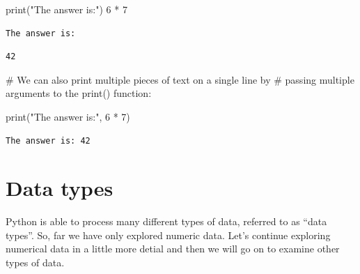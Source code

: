 \documentclass[
  letterpaper,
  DIV=11,
  numbers=noendperiod]{scrreprt}
\newenvironment{Shaded}{\begin{snugshade}}{\end{snugshade}}
\newcommand{\BuiltInTok}[1]{\textcolor[rgb]{0.00,0.23,0.31}{#1}}
\newcommand{\CommentTok}[1]{\textcolor[rgb]{0.37,0.37,0.37}{#1}}
\newcommand{\DecValTok}[1]{\textcolor[rgb]{0.68,0.00,0.00}{#1}}
\newcommand{\NormalTok}[1]{\textcolor[rgb]{0.00,0.23,0.31}{#1}}
\newcommand{\OperatorTok}[1]{\textcolor[rgb]{0.37,0.37,0.37}{#1}}
\newcommand{\StringTok}[1]{\textcolor[rgb]{0.13,0.47,0.30}{#1}}
\begin{document}
\begin{tcolorbox}[enhanced jigsaw, colframe=quarto-callout-note-color-frame, toprule=.15mm, left=2mm, breakable, colbacktitle=quarto-callout-note-color!10!white, arc=.35mm, opacityback=0, colback=white, leftrule=.75mm, title=\textcolor{quarto-callout-note-color}{\faInfo}\hspace{0.5em}{Solution}, bottomrule=.15mm, bottomtitle=1mm, toptitle=1mm, titlerule=0mm, rightrule=.15mm, opacitybacktitle=0.6, coltitle=black]

\begin{Shaded}
\begin{Highlighting}[]
\BuiltInTok{print}\NormalTok{(}\StringTok{"The answer is:"}\NormalTok{)}
\DecValTok{6} \OperatorTok{*} \DecValTok{7}
\end{Highlighting}
\end{Shaded}

\begin{verbatim}
The answer is:
\end{verbatim}

\begin{verbatim}
42
\end{verbatim}

\begin{Shaded}
\begin{Highlighting}[]
\CommentTok{\# We can also print multiple pieces of text on a single line by }
\CommentTok{\# passing multiple arguments to the print() function: }

\BuiltInTok{print}\NormalTok{(}\StringTok{"The answer is:"}\NormalTok{, }\DecValTok{6} \OperatorTok{*} \DecValTok{7}\NormalTok{)}
\end{Highlighting}
\end{Shaded}

\begin{verbatim}
The answer is: 42
\end{verbatim}

\end{tcolorbox}

\section{Data types}\label{data-types}

Python is able to process many different types of data, referred to as
``data types''. So, far we have only explored numeric data. Let's
continue exploring numerical data in a little more detial and then we
will go on to examine other types of data.
\end{document}
